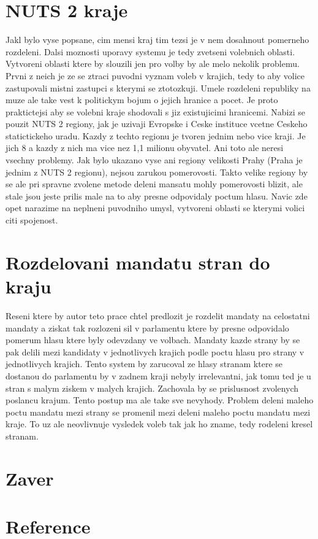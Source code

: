 \documentclass[12pt,a4paper]{report}
\begin{document}
\section{NUTS 2 kraje}
Jakl bylo vyse popsane, cim mensi kraj tim tezsi je v nem dosahnout pomerneho rozdeleni.
Dalsi moznosti uporavy systemu je tedy zvetseni volebnich oblasti.
Vytvoreni oblasti ktere by slouzili jen pro volby by ale melo nekolik problemu.
Prvni z neich je ze se ztraci puvodni vyznam voleb v krajich, tedy to aby volice zastupovali  mistni zastupci s kterymi se ztotozkuji.
Umele rozdeleni republiky na  muze ale take vest k politickym bojum o jejich hranice a pocet. %
Je proto praktictejsi aby se volebni kraje shodovali s jiz existujicimi hranicemi.
Nabizi se pouzit NUTS 2 regiony, jak je uzivaji Evropske i Ceske instituce vcetne Ceskeho statictickeho uradu.
Kazdy z techto regionu je tvoren jednim nebo vice kraji.
Je jich 8 a kazdy z nich ma vice nez 1,1 milionu obyvatel.
Ani toto ale neresi vsechny problemy.
Jak bylo ukazano vyse ani regiony velikosti Prahy (Praha je jednim z NUTS 2 regionu), nejsou zarukou pomerovosti.
Takto velike regiony by se ale pri spravne zvolene metode deleni mansatu mohly pomerovosti blizit, ale stale jsou jeste prilis male na to aby presne odpovidaly poctum hlasu.
Navic zde opet narazime na neplneni puvodniho umysl, vytvoreni oblasti se kterymi volici citi spojenost.
\section{Rozdelovani mandatu stran do kraju}
Reseni ktere by autor teto prace chtel predlozit je rozdelit mandaty na celostatni mandaty a ziskat tak rozlozeni sil v parlamentu ktere by presne odpovidalo pomerum hlasu ktere byly odevzdany ve volbach.
Mandaty kazde strany by se pak delili mezi kandidaty v jednotlivych krajich podle poctu hlasu pro strany v jednotlivych krajich.
Tento system by zarucoval ze hlasy stranam ktere se dostanou do parlamentu by v zadnem kraji nebyly irrelevantni, jak tomu ted je u stran s malym ziskem v malych krajich. 
Zachovala by se prislusnost zvolenych poslancu krajum.
Tento postup ma ale take sve nevyhody.
Problem deleni maleho poctu mandatu mezi strany se promenil mezi deleni maleho poctu mandatu mezi kraje.
To uz ale neovlivnuje vysledek voleb tak jak ho zname, tedy rodeleni kresel stranam.


\section{Zaver}

\section*{Reference}
\printbibliography[heading=none]
\end{document}
